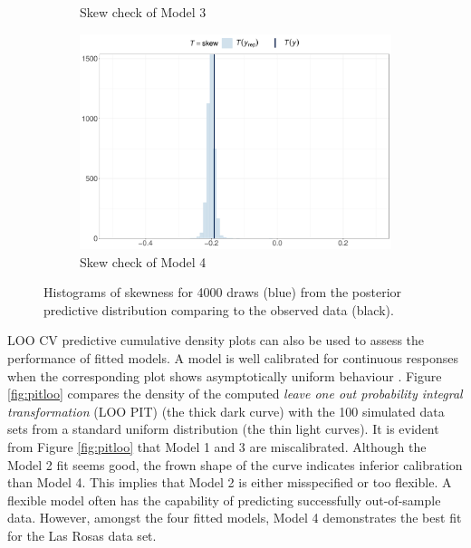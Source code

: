 \documentclass[a4paper]{article}   	%
\begin{document}
\begin{figure}[!htp]
\begin{subfigure}[t]{0.45\textwidth}
			\caption{Skew check of Model 3}
		\end{subfigure}
		\begin{subfigure}[t]{0.45\textwidth}
			\includegraphics[width=\linewidth]{Images/skew_STRand_scale.pdf}
			\caption{Skew check of Model 4}
		\end{subfigure}
		\caption{Histograms of skewness for 4000 draws (blue) from the posterior predictive distribution comparing to the observed data (black).}\label{fig:skewcheck}
	\end{figure}
	
	
	LOO CV predictive cumulative density plots can also be used to assess the performance of fitted models. A model is well calibrated for continuous responses when the corresponding plot shows asymptotically uniform behaviour \parencite{gabry2019Visualization, Gelman2013Bayesian}. Figure \ref{fig:pitloo} compares the density of the computed \emph{leave one out probability integral transformation} (LOO PIT) (the thick dark curve) with the 100 simulated data sets from a standard uniform distribution (the thin light curves). It is evident from Figure \ref{fig:pitloo} that Model 1 and 3 are miscalibrated. Although the Model 2 fit seems good, the frown shape of the curve indicates inferior calibration than Model 4. This implies that Model 2 is either misspecified or too flexible. A flexible model often has the capability of predicting successfully out-of-sample data. However, amongst the four fitted models, Model 4 demonstrates the best fit for the Las Rosas data set.
	
\end{document}
